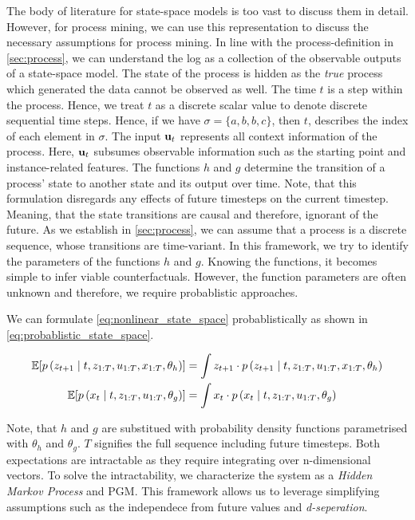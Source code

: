 \documentclass[./../../paper.tex]{subfiles}
\begin{document}
The body of literature for state-space models is too vast to discuss them in detail. 
However, for process mining, we can use this representation to discuss the necessary assumptions for process mining.
In line with the process-definition in \autoref{sec:process}, we can understand the \gls{log} as a collection of the observable outputs of a state-space model. 
The state of the process is hidden as the \emph{true} process which generated the data cannot be observed as well. The time $t$ is a step within the process. Hence, we treat $t$ as a discrete scalar value to denote discrete sequential time steps. Hence, if we have $\sigma=\{a,b,b,c\}$, then $t$, describes the index of each element in $\sigma$.  The input $\mathbf{u}_t$ represents all context information of the process. Here, $\mathbf{u}_t$ subsumes observable information such as the starting point and \gls{instance}-related features. The functions $h$ and $g$ determine the transition of a process' state to another state and its output over time. Note, that this formulation disregards any effects of future timesteps on the current timestep. Meaning, that the state transitions are causal and therefore, ignorant of the future.
As we establish in \autoref{sec:process}, we can assume that a process is a discrete sequence, whose transitions are time-variant. 
In this framework, we try to identify the parameters of the functions $h$ and $g$. Knowing the functions, it becomes simple to infer viable counterfactuals. However, the function parameters are often unknown and therefore, we require probablistic approaches.

We can formulate \autoref{eq:nonlinear_state_space} probablistically as shown in \autoref{eq:probablistic_state_space}.

\begin{align}
    \label{eq:probablistic_state_space}
    \mathbb{E}[p\left(z_{t+1} \mid t, z_{1:T}, u_{1:T}, x_{1:T}, \theta_h\right)] & =
    \int z_{t+1} \cdot p\left(z_{t+1} \mid t, z_{1:T}, u_{1:T}, x_{1:T}, \theta_h\right) \\
    \mathbb{E}[p\left(x_t \mid t, z_{1:T}, u_{1:T}, \theta_g\right)]   & =
    \int x_{t} \cdot p\left(x_t \mid t, z_{1:T}, u_{1:T}, \theta_g\right) \nonumber
\end{align}

Note, that $h$ and $g$ are substitued with probability density functions parametrised with $\theta_h$ and $\theta_g$. $T$ signifies the full sequence including future timesteps.
Both expectations are intractable as they require integrating over n-dimensional vectors. To solve the intractability, we characterize the system as a \emph{Hidden Markov Process} and \gls{PGM}. This framework allows us to leverage simplifying assumptions such as the independece from future values and \emph{d-seperation}. 
\end{document}
